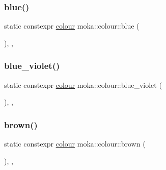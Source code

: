 \subsubsection{\texorpdfstring{blue()}{blue()}}
{\footnotesize\ttfamily static constexpr \mbox{\hyperlink{classmoka_1_1colour}{colour}} moka\+::colour\+::blue (\begin{DoxyParamCaption}{ }\end{DoxyParamCaption})\hspace{0.3cm}{\ttfamily [inline]}, {\ttfamily [static]}, {\ttfamily [noexcept]}}

\mbox{\label{classmoka_1_1colour_a95909c5c6b37b9147c4667d83341060c}} 
\subsubsection{\texorpdfstring{blue\_violet()}{blue\_violet()}}
{\footnotesize\ttfamily static constexpr \mbox{\hyperlink{classmoka_1_1colour}{colour}} moka\+::colour\+::blue\+\_\+violet (\begin{DoxyParamCaption}{ }\end{DoxyParamCaption})\hspace{0.3cm}{\ttfamily [inline]}, {\ttfamily [static]}, {\ttfamily [noexcept]}}

\mbox{\label{classmoka_1_1colour_a0de74dcc468f847e87c04fc8ae30e144}} 
\subsubsection{\texorpdfstring{brown()}{brown()}}
{\footnotesize\ttfamily static constexpr \mbox{\hyperlink{classmoka_1_1colour}{colour}} moka\+::colour\+::brown (\begin{DoxyParamCaption}{ }\end{DoxyParamCaption})\hspace{0.3cm}{\ttfamily [inline]}, {\ttfamily [static]}, {\ttfamily [noexcept]}}

\mbox{\label{classmoka_1_1colour_a59fe41d1e1b8fc4ff70128b19846b327}} 
